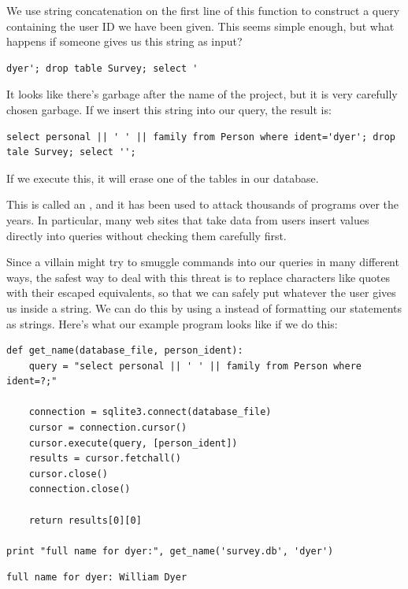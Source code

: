 \documentclass{book}
\begin{document}
We use string concatenation on the first line of this function to
construct a query containing the user ID we have been given. This seems
simple enough, but what happens if someone gives us this string as
input?

\begin{verbatim}
dyer'; drop table Survey; select '
\end{verbatim}

It looks like there's garbage after the name of the project, but it is
very carefully chosen garbage. If we insert this string into our query,
the result is:

\begin{verbatim}
select personal || ' ' || family from Person where ident='dyer'; drop tale Survey; select '';
\end{verbatim}

If we execute this, it will erase one of the tables in our database.

This is called an , and it has been used to attack thousands of programs over the
years. In particular, many web sites that take data from users insert
values directly into queries without checking them carefully first.

Since a villain might try to smuggle commands into our queries in many
different ways, the safest way to deal with this threat is to replace
characters like quotes with their escaped equivalents, so that we can
safely put whatever the user gives us inside a string. We can do this by
using a  instead of
formatting our statements as strings. Here's what our example program
looks like if we do this:

\begin{verbatim}
def get_name(database_file, person_ident):
    query = "select personal || ' ' || family from Person where ident=?;"

    connection = sqlite3.connect(database_file)
    cursor = connection.cursor()
    cursor.execute(query, [person_ident])
    results = cursor.fetchall()
    cursor.close()
    connection.close()

    return results[0][0]

print "full name for dyer:", get_name('survey.db', 'dyer')
\end{verbatim}

\begin{verbatim}
full name for dyer: William Dyer
\end{verbatim}
\end{document}
